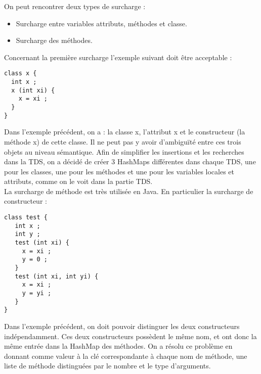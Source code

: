 
On peut rencontrer deux types de surcharge :\\
\begin{itemize}
	\item Surcharge entre variables attributs, méthodes et classe.
	\item Surcharge des méthodes.
\end{itemize}

Concernant la première surcharge l'exemple suivant doit être acceptable :\\

\begin{verbatim}
class x {
  int x ;
  x (int xi) {
    x = xi ;
  }
}
\end{verbatim}

Dans l'exemple précédent, on a : la classe x, l'attribut x et le constructeur
(la méthode x) de cette classe. Il ne peut pas y avoir d’ambiguïté entre ces
trois objets au niveau sémantique. Afin de simplifier les insertions et les
recherches dans la TDS, on a décidé de créer 3 HashMaps différentes dans chaque
TDS, une pour les classes, une pour les méthodes et une pour les variables
locales et attributs, comme on le voit dans la partie TDS.\\

La surcharge de méthode est très utilisée en Java. En particulier la surcharge
de constructeur :\\

\begin{verbatim}
class test {
   int x ;
   int y ;
   test (int xi) {
     x = xi ;
     y = 0 ;
   }
   test (int xi, int yi) {
     x = xi ;
     y = yi ;
   }
}
\end{verbatim}

Dans l'exemple précédent, on doit pouvoir distinguer les deux constructeurs
indépendamment. Ces deux constructeurs possèdent le même nom, et ont donc la
même entrée dans la HashMap des méthodes. On a résolu ce problème en donnant
comme valeur à la clé correspondante à chaque nom de méthode, une liste de
méthode distinguées par le nombre et le type d'arguments.


